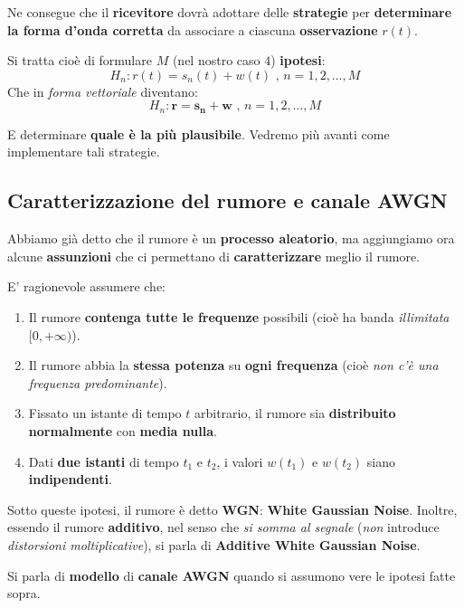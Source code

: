 Ne consegue che il \textbf{ricevitore} dovrà adottare delle \textbf{strategie}
per \textbf{determinare la forma d'onda corretta} da associare
a ciascuna \textbf{osservazione} $r(t)$.

Si tratta cioè di formulare $M$ (nel nostro caso $4$) \textbf{ipotesi}:
\[
    H_n : r(t) = s_n(t) + w(t) \text{ , } n = 1,2,\ldots ,M
\]
Che in \textit{forma vettoriale} diventano:
\[
    H_n : \mathbf{r} = \mathbf{s_n} + \mathbf{w} \text{ , } n = 1,2,\ldots ,M
\]

E determinare \textbf{quale è la più plausibile}.
Vedremo più avanti come implementare tali strategie.

\subsection{Caratterizzazione del rumore e canale AWGN}

Abbiamo già detto che il rumore è un \textbf{processo aleatorio}, ma
aggiungiamo ora alcune \textbf{assunzioni} che ci permettano di 
\textbf{caratterizzare} meglio il rumore.

\begin{remark}
    E' ragionevole assumere che:
    \begin{enumerate}
        \item Il rumore \textbf{contenga tutte le frequenze} possibili 
            (cioè ha banda \textit{illimitata} $[0,+\infty)$).
        \item Il rumore abbia la \textbf{stessa potenza} su \textbf{ogni frequenza} 
            (cioè \textit{non c'è una frequenza predominante}).
        \item Fissato un istante di tempo $t$ arbitrario, il rumore sia 
            \textbf{distribuito normalmente} con \textbf{media nulla}.
        \item Dati \textbf{due istanti} di tempo $t_{1}$ e $t_{2}$, i
            valori $w(t_{1})$ e $w(t_{2})$ siano \textbf{indipendenti}.
    \end{enumerate}
\end{remark}

Sotto queste ipotesi, il rumore è detto \textbf{WGN}: \textbf{White Gaussian Noise}.
Inoltre, essendo il rumore \textbf{additivo}, nel senso che 
\textit{si somma al segnale} (\textit{non} introduce \textit{distorsioni moltiplicative}),
si parla di \textbf{Additive White Gaussian Noise}.

\begin{definition}
    Si parla di \textbf{modello} di \textbf{canale AWGN} quando
    si assumono vere le ipotesi fatte sopra.
\end{definition}

